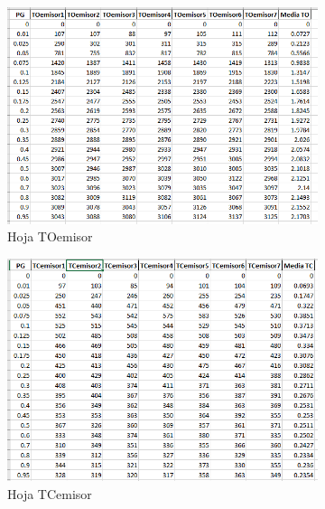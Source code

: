 \documentclass{article}
\begin{document}
\begin{figure}[h]
	\centering
	\begin{subfigure}{0.5\textwidth}
		\includegraphics[width=\linewidth]{src/TOemisor.png}
		\caption{Hoja TOemisor}
		\label{fig:TOemisorcsv}
	\end{subfigure}%
	\begin{subfigure}{0.5\textwidth}
		\includegraphics[width=\linewidth]{src/TCemisor.png}
		\caption{Hoja TCemisor}
		\label{fig:TCemisorcsv}
	\end{subfigure}
	\caption{}
	\label{fig:Ambastablas}
\end{figure}
\end{document}
